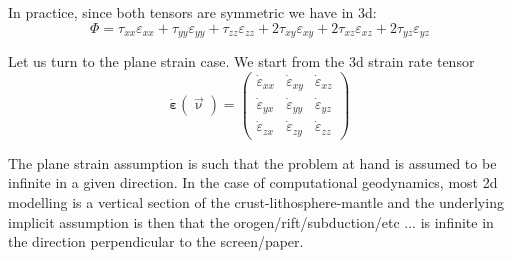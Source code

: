 \documentclass[a4paper,11pt]{article}
\begin{document}
In practice, since both tensors are symmetric we have in 3d:
\[
\Phi = 
\tau_{xx} {\varepsilon}_{xx} +
\tau_{yy} {\varepsilon}_{yy} +
\tau_{zz} {\varepsilon}_{zz} +
2\tau_{xy} {\varepsilon}_{xy} +
2\tau_{xz} {\varepsilon}_{xz} +
2\tau_{yz} {\varepsilon}_{yz} 
\]

Let us turn to the plane strain case.
We start from the 3d strain rate tensor 
\[
\dot{\bm \varepsilon}(\vec\upnu) = 
\left(
\begin{array}{ccc}
\dot{\varepsilon}_{xx} & \dot{\varepsilon}_{xy} & \dot{\varepsilon}_{xz} \\
\dot{\varepsilon}_{yx} & \dot{\varepsilon}_{yy} & \dot{\varepsilon}_{yz} \\
\dot{\varepsilon}_{zx} & \dot{\varepsilon}_{zy} & \dot{\varepsilon}_{zz} 
\end{array}
\right)
\]

The plane strain assumption is such that the problem at hand is assumed to be  
infinite in a given direction. In the case of computational geodynamics, most 2d  
modelling is a vertical section of the crust-lithosphere-mantle
and the underlying implicit assumption is then that the orogen/rift/subduction/etc ... 
is infinite in the direction perpendicular to the screen/paper.  
\end{document}
